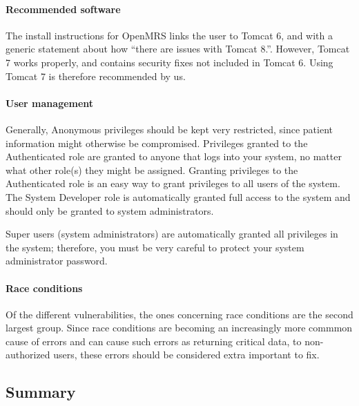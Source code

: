 \documentclass{report} %
\begin{document}
\paragraph{Recommended software}
The install instructions for OpenMRS links the user to Tomcat 6, and with a
generic statement about how ``there are issues with Tomcat 8.''. However, Tomcat
7 works properly, and contains security fixes not included in Tomcat 6. Using
Tomcat 7 is therefore recommended by us.

\paragraph{User management}
Generally, Anonymous privileges should be kept very restricted, since patient
information might otherwise be compromised. Privileges granted to the
Authenticated role are granted to anyone that logs into your system, no matter
what other role(s) they might be assigned. Granting privileges to the
Authenticated role is an easy way to grant privileges to all users of the
system. The System Developer role is automatically granted full access to the
system and should only be granted to system administrators.

Super users (system administrators) are automatically granted all privileges
in the system; therefore, you must be very careful to protect your system
administrator password.
\autocite[]{FlossManuals}

\paragraph{Race conditions}
Of the different vulnerabilities, the ones concerning race conditions are 
the second largest group. Since race conditions are becoming an increasingly
more commmon cause of errors and can cause such errors as returning critical
data, to non-authorized users, these errors should be considered extra important
to fix.

\autocite[]{Floss}


\subsection{Summary}
\end{document}
